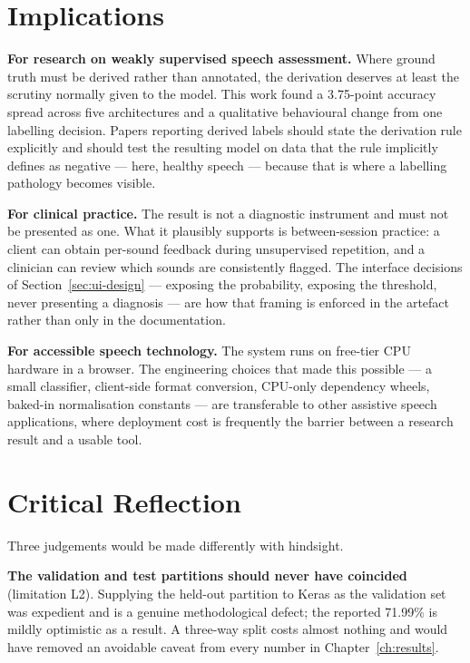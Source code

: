 \section{Implications}
\label{sec:conc-implications}

\textbf{For research on weakly supervised speech assessment.} Where ground truth
must be derived rather than annotated, the derivation deserves at least the
scrutiny normally given to the model. This work found a 3.75-point accuracy
spread across five architectures and a qualitative behavioural change from one
labelling decision. Papers reporting derived labels should state the derivation
rule explicitly and should test the resulting model on data that the rule
implicitly defines as negative --- here, healthy speech --- because that is where
a labelling pathology becomes visible.

\textbf{For clinical practice.} The result is not a diagnostic instrument and
must not be presented as one. What it plausibly supports is between-session
practice: a client can obtain per-sound feedback during unsupervised repetition,
and a clinician can review which sounds are consistently flagged. The interface
decisions of Section~\ref{sec:ui-design} --- exposing the probability, exposing
the threshold, never presenting a diagnosis --- are how that framing is enforced
in the artefact rather than only in the documentation.

\textbf{For accessible speech technology.} The system runs on free-tier CPU
hardware in a browser. The engineering choices that made this possible --- a
small classifier, client-side format conversion, CPU-only dependency wheels,
baked-in normalisation constants --- are transferable to other assistive speech
applications, where deployment cost is frequently the barrier between a
research result and a usable tool.

\section{Critical Reflection}
\label{sec:conc-reflection}

Three judgements would be made differently with hindsight.

\textbf{The validation and test partitions should never have coincided}
(limitation L2). Supplying the held-out partition to Keras as the validation set
was expedient and is a genuine methodological defect; the reported 71.99\% is
mildly optimistic as a result. A three-way split costs almost nothing and would
have removed an avoidable caveat from every number in Chapter~\ref{ch:results}.

